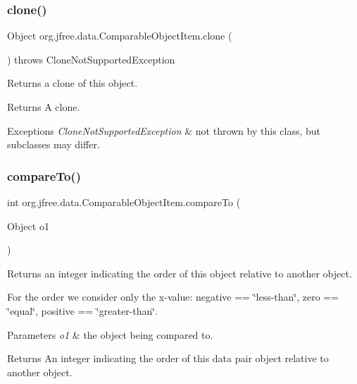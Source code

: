 \subsubsection{\texorpdfstring{clone()}{clone()}}
{\footnotesize\ttfamily Object org.\+jfree.\+data.\+Comparable\+Object\+Item.\+clone (\begin{DoxyParamCaption}{ }\end{DoxyParamCaption}) throws Clone\+Not\+Supported\+Exception}

Returns a clone of this object.

\begin{DoxyReturn}{Returns}
A clone.
\end{DoxyReturn}

\begin{DoxyExceptions}{Exceptions}
{\em Clone\+Not\+Supported\+Exception} & not thrown by this class, but subclasses may differ. \\
\hline
\end{DoxyExceptions}
\mbox{\label{classorg_1_1jfree_1_1data_1_1_comparable_object_item_adea6a348292b0c15e73b004ca6f6b702}} 
\subsubsection{\texorpdfstring{compare\+To()}{compareTo()}}
{\footnotesize\ttfamily int org.\+jfree.\+data.\+Comparable\+Object\+Item.\+compare\+To (\begin{DoxyParamCaption}\item[{Object}]{o1 }\end{DoxyParamCaption})}

Returns an integer indicating the order of this object relative to another object. 

For the order we consider only the x-\/value\+: negative == \char`\"{}less-\/than\char`\"{}, zero == \char`\"{}equal\char`\"{}, positive == \char`\"{}greater-\/than\char`\"{}.


\begin{DoxyParams}{Parameters}
{\em o1} & the object being compared to.\\
\hline
\end{DoxyParams}
\begin{DoxyReturn}{Returns}
An integer indicating the order of this data pair object relative to another object. 
\end{DoxyReturn}
\mbox{\label{classorg_1_1jfree_1_1data_1_1_comparable_object_item_ae227d51af55b50c7707e89a4f5d8fc38}} 
